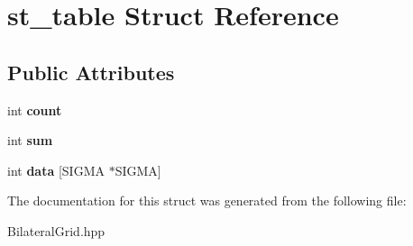 \hypertarget{structst__table}{}\section{st\+\_\+table Struct Reference}
\label{structst__table}
\subsection*{Public Attributes}
\begin{DoxyCompactItemize}
\item 
int {\bfseries count}\hypertarget{structst__table_a96b9713caeaab650cbcd2268c81ba8a3}{}\label{structst__table_a96b9713caeaab650cbcd2268c81ba8a3}

\item 
int {\bfseries sum}\hypertarget{structst__table_a88579c38193a02ed60082be16a75e317}{}\label{structst__table_a88579c38193a02ed60082be16a75e317}

\item 
int {\bfseries data} \mbox{[}S\+I\+G\+MA $\ast$S\+I\+G\+MA\mbox{]}\hypertarget{structst__table_a6d572a1a148e8a9a69775d359bb37627}{}\label{structst__table_a6d572a1a148e8a9a69775d359bb37627}

\end{DoxyCompactItemize}


The documentation for this struct was generated from the following file\+:\begin{DoxyCompactItemize}
\item 
Bilateral\+Grid.\+hpp\end{DoxyCompactItemize}
